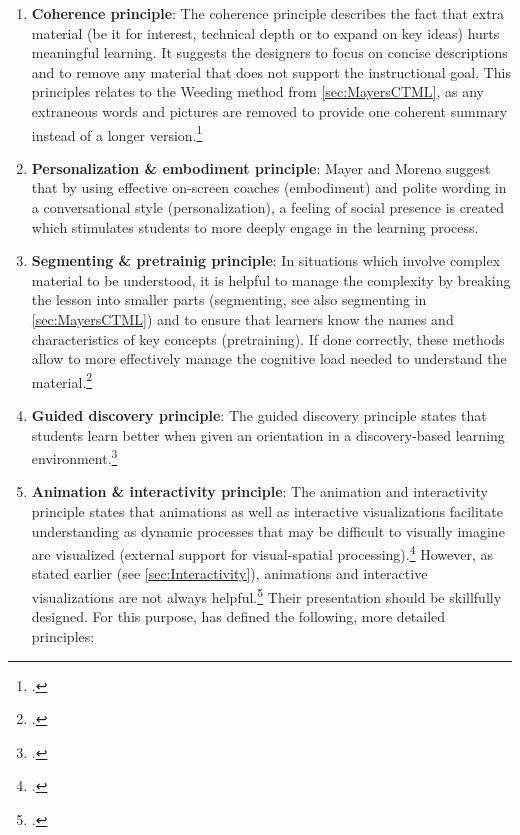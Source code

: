 \begin{enumerate}
    \item \textbf{Coherence principle}: The coherence principle describes the fact that extra material (be it for interest, technical depth or to expand on key ideas) hurts meaningful learning. It suggests the designers to focus on concise descriptions and to remove any material that does not support the instructional goal. This principles relates to the Weeding method from \ref{sec:MayersCTML}, as any extraneous words and pictures are removed to provide one coherent summary instead of a longer version.\footcites[Cf.][chapter 8, paragraphs 1 et seq]{ClarkElearningscienceinstruction2016}[cf.][p.6]{MayerMultimediaLearning2009}[cf.][p.22]{MayerAnimationAidMultimedia2001}
    \item \textbf{Personalization \& embodiment principle}: Mayer and Moreno suggest that by using effective on-screen coaches (embodiment) and polite wording in a conversational style (personalization), a feeling of social presence is created which stimulates students to more deeply engage in the learning process. 
    \item \textbf{Segmenting \& pretrainig principle}: In situations which involve complex material to be understood, it is helpful to manage the complexity by breaking the lesson into smaller parts (segmenting, see also segmenting in \ref{sec:MayersCTML}) and to ensure that learners know the names and characteristics of key concepts (pretraining). If done correctly, these methods allow to more effectively manage the cognitive load needed to understand the material.\footcites[Cf.][chapters 9 and 10]{ClarkElearningscienceinstruction2016}
    \item \textbf{Guided discovery principle}: The guided discovery principle states that students learn better when given an orientation in a discovery-based learning environment.\footcites[Cf.][p.7]{MayerMultimediaLearning2009}
    \item \textbf{Animation \& interactivity principle}: The animation and interactivity principle states that animations as well as interactive visualizations facilitate understanding as dynamic processes that may be difficult to visually imagine are visualized (external support for visual-spatial processing).\footcites[Cf.][p.290]{Betrancourtanimationinteractivityprinciples2005}[cf.][p.81]{MunzerLearningmultimediapresentations2009}[cf.][p.19]{LeeScreenDesignGuidelines1999}[cf.][p.814]{MayerNineWaysReduce2003} However, as stated earlier (see \ref{sec:Interactivity}), animations and interactive visualizations are not always helpful.\footcites[Cf.][p.292]{PatwardhanWhendoeshigher2015}[cf.][p.7]{MayerMultimediaLearning2009} Their presentation should be skillfully designed. For this purpose, \cite{MorenoInteractiveMultimodalLearning2007} has defined the following, more detailed principles: 

\end{enumerate}
